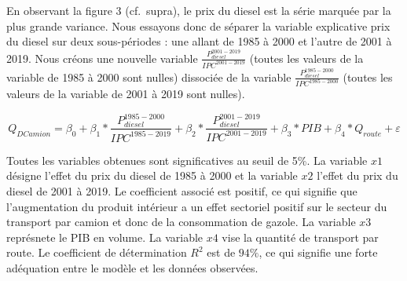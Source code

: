 \documentclass[
]{article}
\begin{document}
En observant la figure 3 (cf.~supra), le prix du diesel est la série
marquée par la plus grande variance. Nous essayons donc de séparer la
variable explicative prix du diesel sur deux sous-périodes : une allant
de 1985 à 2000 et l'autre de 2001 à 2019. Nous créons une nouvelle
variable \(\frac{P_{diesel}^{2001-2019}}{IPC^{2001-2019}}\) (toutes les
valeurs de la variable de 1985 à 2000 sont nulles) dissociée de la
variable \(\frac{P_{diesel}^{1985-2000}}{IPC^{1985-2000}}\) (toutes les
valeurs de la variable de 2001 à 2019 sont nulles).

\begin{equation}
    \label{eq:modele2}
    Q_{DCamion} = \beta_0 + \beta_1*\frac{P_{diesel}^{1985-2000}}{IPC^{1985-2019}} + \beta_2*\frac{P_{diesel}^{2001-2019}}{IPC^{2001-2019}} + \beta_3*PIB + \beta_4*Q_{route} + \varepsilon
\end{equation}

Toutes les variables obtenues sont significatives au seuil de 5\%. La
variable \(x1\) désigne l'effet du prix du diesel de 1985 à 2000 et la
variable \(x2\) l'effet du prix du diesel de 2001 à 2019. Le coefficient
associé est positif, ce qui signifie que l'augmentation du produit
intérieur a un effet sectoriel positif sur le secteur du transport par
camion et donc de la consommation de gazole. La variable \(x3\)
représnete le PIB en volume. La variable \(x4\) vise la quantité de
transport par route. Le coefficient de détermination \(R^2\) est de
\(94\%\), ce qui signifie une forte adéquation entre le modèle et les
données observées.
\end{document}

